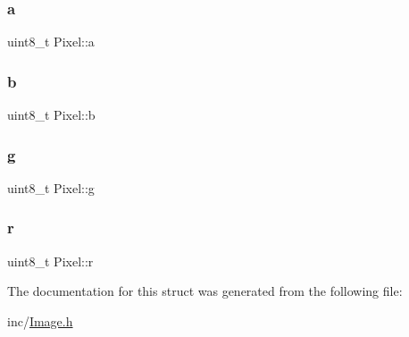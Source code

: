 \subsubsection{\texorpdfstring{a}{a}}
{\footnotesize\ttfamily uint8\+\_\+t Pixel\+::a}

\mbox{\label{structPixel_abc9f592730eddbfcb270a1974a498d78}} 
\subsubsection{\texorpdfstring{b}{b}}
{\footnotesize\ttfamily uint8\+\_\+t Pixel\+::b}

\mbox{\label{structPixel_aeab078b7768caf273f8fe1daffa50729}} 
\subsubsection{\texorpdfstring{g}{g}}
{\footnotesize\ttfamily uint8\+\_\+t Pixel\+::g}

\mbox{\label{structPixel_a47d65d4a410f57c46746ddedd709e177}} 
\subsubsection{\texorpdfstring{r}{r}}
{\footnotesize\ttfamily uint8\+\_\+t Pixel\+::r}



The documentation for this struct was generated from the following file\+:\begin{DoxyCompactItemize}
\item 
inc/\hyperlink{Image_8h}{Image.\+h}\end{DoxyCompactItemize}
